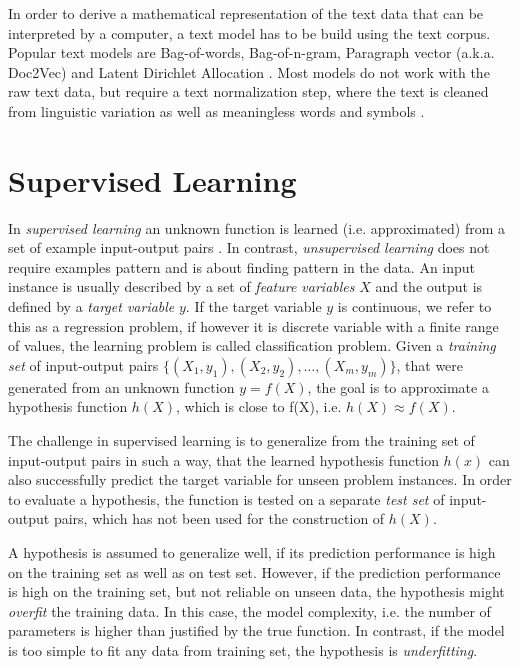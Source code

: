 In order to derive a mathematical representation of the text data that can be interpreted by a computer, a text model has to be build using the text corpus.
Popular text models are Bag-of-words, Bag-of-n-gram, Paragraph vector (a.k.a. Doc2Vec) \cite{DBLP:conf/icml/LeM14} and Latent Dirichlet Allocation \cite{DBLP:journals/jmlr/BleiNJ03}.
Most models do not work with the raw text data, but require a text normalization step, where the text is cleaned from linguistic variation as well as meaningless words and symbols \cite{DBLP:books/lib/JurafskyM09}.

\section{Supervised Learning}

In \textit{supervised learning} an unknown function is learned (i.e. approximated) from a set of example input-output pairs \cite{DBLP:books/daglib/0023820}.
In contrast, \textit{unsupervised learning} does not require examples pattern and is about finding pattern in the data. 
An input instance is usually described by a set of \textit{feature variables} $X$ and the output is defined by a \textit{target variable} $y$.
If the target variable $y$ is continuous, we refer to this as a regression problem, if however it is discrete variable with a finite range of values, the learning problem is called classification problem.
Given a \textit{training set} of input-output pairs $\{(X_1, y_1), (X_2, y_2), \dots, (X_m,y_m)\}$, that were generated from an unknown function $y = f(X)$, the goal is to approximate a hypothesis function $h(X)$, which is close to f(X), i.e. $h(X) \approx f(X)$.

The challenge in supervised learning is to generalize from the training set of input-output pairs in such a way, that the learned hypothesis function $h(x)$ can also successfully predict the target variable for unseen problem instances.
In order to evaluate a hypothesis, the function is tested on a separate \textit{test set} of input-output pairs, which has not been used for the construction of $h(X)$.

A hypothesis is assumed to generalize well, if its prediction performance is high on the training set as well as on test set.
However, if the prediction performance is high on the training set, but not reliable on unseen data, the hypothesis might \textit{overfit} the training data.
In this case, the model complexity, i.e. the number of parameters is higher than justified by the true function. 
In contrast, if the model is too simple to fit any data from training set, the hypothesis is \textit{underfitting}.

